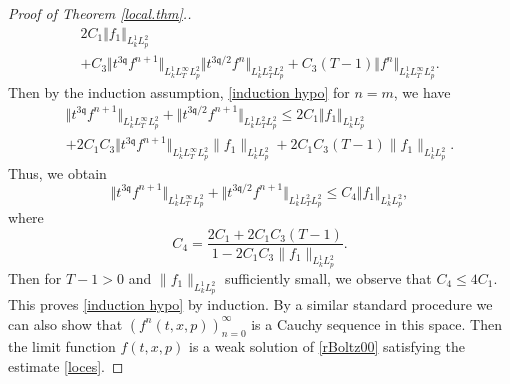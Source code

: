 \documentclass[reqno]{amsart}
\newcommand{\pv}{p}
\def\norm#1{\big\Vert#1\big\Vert}
\newcommand{\qq}{\mathfrak{q}}
\newcommand{\tTq}{t^{3\qq}}
\theoremstyle{definition}
\numberwithin{equation}{section}
\numberwithin{theorem}{section}
\begin{document}
\begin{proof}[Proof of Theorem \ref{local.thm}.]
\begin{multline*}
2C_1\Vert {f}_1\Vert_{L^1_kL^2_{\pv}}
\\
+
C_3{\Vert{\tTq f^{n+1}}\Vert_{L^1_kL^\infty_TL^2_{\pv}}} {\norm{t^{3\qq/2} f^{n}}_{L^1_kL^2_TL^2_{\pv}}}
+
C_3
(T-1) \norm{ {f}^{n} }_{L^1_k L^\infty_{T}L^2_{\pv}}.
\end{multline*}
Then by the induction assumption, \eqref{induction hypo} for $n=m$, we have 
\begin{multline*}
    \norm{\tTq f^{n+1}}_{L^1_kL^\infty_TL^2_{\pv}}
+
{\norm{t^{3\qq/2} f^{n+1}}_{L^1_kL^2_TL^2_{\pv}}}
\leq 
2C_1\Vert {f}_1\Vert_{L^1_kL^2_{\pv}}
\\
+
2C_1 C_3 
{\Vert{\tTq f^{n+1}}\Vert_{L^1_kL^\infty_TL^2_{\pv}}} 
\|f_1\|_{L^1_{{k}}L^2_{\pv}}
+
2C_1C_3 
(T-1) 
\|f_1\|_{L^1_{{k}}L^2_{\pv}}.
\end{multline*}
Thus, we obtain 
\begin{equation*}
        \norm{\tTq f^{n+1}}_{L^1_kL^\infty_TL^2_{\pv}}
+
{\norm{t^{3\qq/2} f^{n+1}}_{L^1_kL^2_TL^2_{\pv}}}
\leq
C_4\Vert {f}_1\Vert_{L^1_kL^2_{\pv}},
\end{equation*}
where
\begin{equation*}
    C_4 
    =
  \frac{2C_1 + 2C_1C_3 
(T-1) }{1-2C_1 C_3  \|f_1\|_{L^1_{{k}}L^2_{\pv}}}.
\end{equation*}
Then for $T-1>0$ and $\|f_1\|_{L^1_{{k}}L^2_{\pv}}$ sufficiently small, we observe that $C_4  \leq 4 C_1$.  This proves \eqref{induction hypo} by induction.  By a similar standard procedure we can also show that $(f^n(t,x,\pv))_{n=0}^\infty$ is a Cauchy sequence in this space.  Then the limit function $f(t,x,\pv)$  is a weak solution of  \eqref{rBoltz00} satisfying the estimate \eqref{loces}.  




\end{proof}
\end{document}
